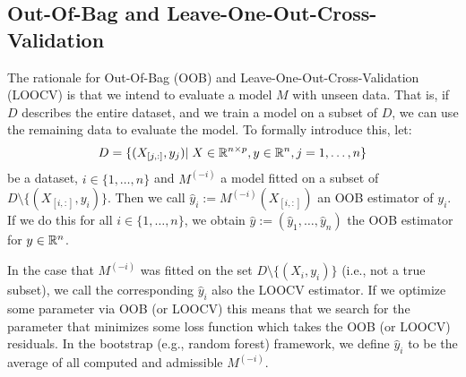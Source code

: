 {	\subsection{Out-Of-Bag and Leave-One-Out-Cross-Validation}{ \label{sec:OOB_LOOCV}
		The rationale for Out-Of-Bag ({OOB}) and Leave-One-Out-Cross-Validation ({LOOCV}) is that we intend to evaluate a model $M$ with unseen data. That is, if $D$ describes the entire dataset, and we train a model on a subset of $D$, we can use the remaining data to evaluate the model. 
		To formally introduce this, let:
		$$
			D=\{(X_{[j,:]},y_j)|\; X\in\mathbb{R}^{n\times p}, y\in \mathbb{R}^n, j=1,\dots,n\}
		$$
		be a dataset, $i\in \{1,\dots,n\}$ and $M^{(-i)}$ a model fitted on a subset of $D\setminus\{(X_{[i,:]},y_i)\}$. Then we call $\hat y_i:= M^{(-i)}(X_{[i,:]})$ an {OOB} estimator of $y_i$. If we do this for all $i\in\{1,\dots,n\}$, we obtain $\hat y := \left(\hat y_1,\dots,\hat y_n\right)$ the OOB estimator for $y\in \mathbb{R}^n$.
		
		In the case that $M^{(-i)}$ was fitted on the set $D\setminus\{(X_i,y_i)\}$ (i.e., not a true subset), we call the corresponding $\hat y_i$ also the LOOCV estimator.	
		If we optimize some parameter via OOB (or LOOCV) this means that we search for the parameter that minimizes some loss function which takes the OOB (or LOOCV) residuals. 
		In the bootstrap (e.g., random forest) framework, we define $\hat y_i$ to be the average of all computed and admissible $M^{(-i)}$. 
	}

}
